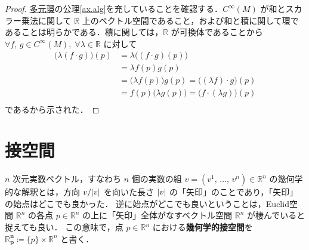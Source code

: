 \documentclass[geometry_main]{subfiles}
\begin{document}
\begin{proof}
	\hyperref[ax.alg]{多元環}の公理\ref{ax.alg}を充していることを確認する．$C^\infty (M)$ が和とスカラー乗法に関して $\mathbb{R}$ 上のベクトル空間であること，および和と積に関して環であることは明らかである．積に関しては，$\mathbb{R}$ が可換体であることから $\forall f,\, g \in C^\infty(M),\; \forall \lambda \in \mathbb{R}$ に対して
	\begin{align}
		\bigl(\lambda (f\cdot g) \bigr)(p) &= \lambda \bigl((f\cdot g)(p)\bigr) \\
		&= \lambda f(p) g(p)   \\
		&= \bigl( \lambda f(p)  \bigr) g(p) = \bigl((\lambda f)\cdot g\bigr)(p) \\
		&= f(p) \bigl( \lambda g(p) \bigr)  = \bigl(f\cdot (\lambda g)\bigr)(p) \\
	\end{align}
	であるから示された．
\end{proof}


\section{接空間}


$n$ 次元実数ベクトル，すなわち $n$ 個の実数の組 $v = (v^1,\, \dots ,\, v^n) \in \mathbb{R}^n$ の幾何学的な解釈とは，方向 $v/\abs{v}$ を向いた長さ $\abs{v}$ の「矢印」のことであり，「矢印」の始点はどこでも良かった．
逆に始点がどこでも良いということは，Euclid空間 $\mathbb{R}^n$ の各点 $p \in \mathbb{R}^n$ の上に「矢印」全体がなすベクトル空間 $\mathbb{R}^n$ が棲んでいると捉えても良い．
この意味で，点 $p \in \mathbb{R}^n$ における\textbf{幾何学的接空間}を $\bm{\mathbb{R}^n_p} \coloneqq \{p\} \times \mathbb{R}^n$ と書く．
\end{document}
